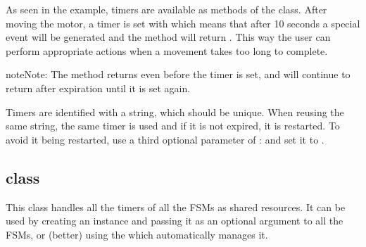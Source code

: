 \documentclass[letterpaper,10pt,english]{sphinxmanual}
\begin{document}
As seen in the example, timers are available as methods of the {\hyperref[\detokenize{fsm:fsmBase}]{}}
class. After moving the motor, a timer is set with {\hyperref[\detokenize{fsm:tmrSet}]{}} which means
that after 10 seconds a special event will be generated and the method
{\hyperref[\detokenize{fsm:tmrExp}]{}} will return . This way the user can perform
appropriate actions when a movement takes too long to complete.

\begin{sphinxadmonition}{note}{Note:}
The {\hyperref[\detokenize{fsm:tmrExp}]{}} method returns  even before the timer is set, and will continue to return  after expiration until it is set again.
\end{sphinxadmonition}

Timers are identified with a string, which should be unique. When reusing the
same string, the same timer is used and if it is not expired, it is restarted.
To avoid it being restarted, use a third optional parameter of {\hyperref[\detokenize{fsm:tmrSet}]{}}:
 and set it to .


\subsection{ class}
\label{\detokenize{timer:fsmtimers-class}}

\begin{fulllineitems}
\label{\detokenize{timer:fsmTimers}}
This class handles all the timers of all the FSMs as shared resources. It
can be used by creating an instance and passing it as an optional argument
to all the FSMs, or (better) using the {\hyperref[\detokenize{loader:module-loader}]{}} which automatically
manages it.

\end{fulllineitems}
\end{document}
